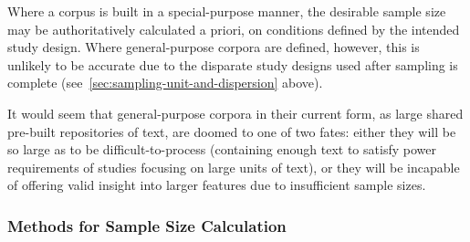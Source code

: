 Where a corpus is built in a special-purpose manner, the desirable sample size may be authoritatively calculated a priori, on conditions defined by the intended study design.  Where general-purpose corpora are defined, however, this is unlikely to be accurate due to the disparate study designs used after sampling is complete (see~\ref{sec:sampling-unit-and-dispersion} above).

It would seem that general-purpose corpora in their current form, as large shared pre-built repositories of text, are doomed to one of two fates: either they will be so large as to be difficult-to-process (containing enough text to satisfy power requirements of studies focusing on large units of text), or they will be incapable of offering valid insight into larger features due to insufficient sample sizes.






\subsubsection{Methods for Sample Size Calculation}











